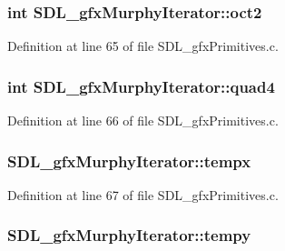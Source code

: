 \subsubsection[{oct2}]{\setlength{\rightskip}{0pt plus 5cm}int S\+D\+L\+\_\+gfx\+Murphy\+Iterator\+::oct2}\label{struct_s_d_l__gfx_murphy_iterator_a62768600f17a4ac8b713b03daab0630d}


Definition at line 65 of file S\+D\+L\+\_\+gfx\+Primitives.\+c.

\hypertarget{struct_s_d_l__gfx_murphy_iterator_ac24801d29079aaba495484e5e8293c7b}{}
\subsubsection[{quad4}]{\setlength{\rightskip}{0pt plus 5cm}int S\+D\+L\+\_\+gfx\+Murphy\+Iterator\+::quad4}\label{struct_s_d_l__gfx_murphy_iterator_ac24801d29079aaba495484e5e8293c7b}


Definition at line 66 of file S\+D\+L\+\_\+gfx\+Primitives.\+c.

\hypertarget{struct_s_d_l__gfx_murphy_iterator_a740ae5d3e6bb0f8305bf810461e04731}{}
\subsubsection[{tempx}]{ S\+D\+L\+\_\+gfx\+Murphy\+Iterator\+::tempx}\label{struct_s_d_l__gfx_murphy_iterator_a740ae5d3e6bb0f8305bf810461e04731}


Definition at line 67 of file S\+D\+L\+\_\+gfx\+Primitives.\+c.

\hypertarget{struct_s_d_l__gfx_murphy_iterator_a03345ad1012f407aad9710faed82c8ab}{}
\subsubsection[{tempy}]{ S\+D\+L\+\_\+gfx\+Murphy\+Iterator\+::tempy}\label{struct_s_d_l__gfx_murphy_iterator_a03345ad1012f407aad9710faed82c8ab}


